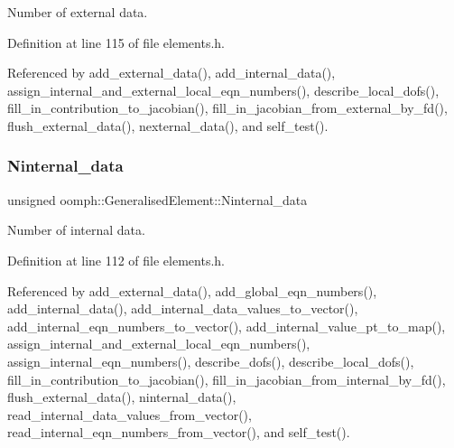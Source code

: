 Number of external data. 



Definition at line 115 of file elements.\+h.



Referenced by add\+\_\+external\+\_\+data(), add\+\_\+internal\+\_\+data(), assign\+\_\+internal\+\_\+and\+\_\+external\+\_\+local\+\_\+eqn\+\_\+numbers(), describe\+\_\+local\+\_\+dofs(), fill\+\_\+in\+\_\+contribution\+\_\+to\+\_\+jacobian(), fill\+\_\+in\+\_\+jacobian\+\_\+from\+\_\+external\+\_\+by\+\_\+fd(), flush\+\_\+external\+\_\+data(), nexternal\+\_\+data(), and self\+\_\+test().

\mbox{\label{classoomph_1_1GeneralisedElement_a79bc03b73044e8367ea24c42dd0775a1}} 
\subsubsection{\texorpdfstring{Ninternal\+\_\+data}{Ninternal\_data}}
{\footnotesize\ttfamily unsigned oomph\+::\+Generalised\+Element\+::\+Ninternal\+\_\+data\hspace{0.3cm}{\ttfamily [private]}}



Number of internal data. 



Definition at line 112 of file elements.\+h.



Referenced by add\+\_\+external\+\_\+data(), add\+\_\+global\+\_\+eqn\+\_\+numbers(), add\+\_\+internal\+\_\+data(), add\+\_\+internal\+\_\+data\+\_\+values\+\_\+to\+\_\+vector(), add\+\_\+internal\+\_\+eqn\+\_\+numbers\+\_\+to\+\_\+vector(), add\+\_\+internal\+\_\+value\+\_\+pt\+\_\+to\+\_\+map(), assign\+\_\+internal\+\_\+and\+\_\+external\+\_\+local\+\_\+eqn\+\_\+numbers(), assign\+\_\+internal\+\_\+eqn\+\_\+numbers(), describe\+\_\+dofs(), describe\+\_\+local\+\_\+dofs(), fill\+\_\+in\+\_\+contribution\+\_\+to\+\_\+jacobian(), fill\+\_\+in\+\_\+jacobian\+\_\+from\+\_\+internal\+\_\+by\+\_\+fd(), flush\+\_\+external\+\_\+data(), ninternal\+\_\+data(), read\+\_\+internal\+\_\+data\+\_\+values\+\_\+from\+\_\+vector(), read\+\_\+internal\+\_\+eqn\+\_\+numbers\+\_\+from\+\_\+vector(), and self\+\_\+test().

